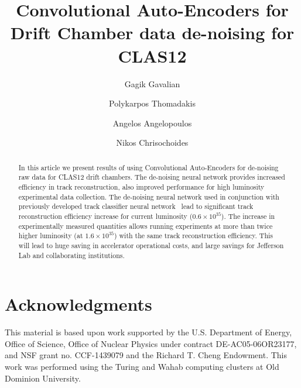 \documentclass[preprint,12pt]{elsarticle}
\title{Convolutional Auto-Encoders for Drift Chamber data de-noising for CLAS12}
\author[1]{Gagik Gavalian}
\author[2]{Polykarpos Thomadakis}
\author[2]{Angelos Angelopoulos}
\author[2]{Nikos Chrisochoides}
\begin{document}
\begin{abstract}
In this article we present results of using Convolutional Auto-Encoders for de-noising raw data for CLAS12 drift chambers.
The de-noising neural network provides increased efficiency in track reconstruction, also improved performance for high 
luminosity experimental data collection. The de-noising neural network used in conjunction with previously developed track 
classifier neural network~\cite{Gavalian:2022hfa} lead to significant track reconstruction efficiency increase for current luminosity
($0.6\times10^{35}$). The increase in experimentally measured quantities allows running experiments at more than 
twice higher luminosity (at $1.6\times10^{35}$) with the same track reconstruction efficiency. This will lead to huge saving in accelerator 
operational costs, and large savings for Jefferson Lab and collaborating institutions.
\end{abstract}
\maketitle














%
%



\newpage

\section{Acknowledgments}

This material is based upon work supported by the U.S. Department of Energy, Office of Science,
Office of Nuclear Physics under contract DE-AC05-06OR23177, and NSF grant no. CCF-1439079 and
the Richard T. Cheng Endowment. This work was performed using the Turing and Wahab computing
clusters at Old Dominion University.
 
\newpage


\end{document}
